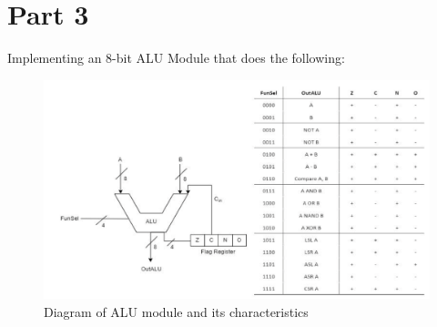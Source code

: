 \documentclass[pdftex,12pt,a4paper]{article}
\begin{document}
\section{Part 3}
Implementing an 8-bit ALU Module that does the following:
\begin{figure}[H]
\centering
\includegraphics[width=1\textwidth]{part3_diagram.png}
\caption{Diagram of ALU module and its characteristics}
\label{fig:part3_diagram}
\end{figure}
\end{document}
